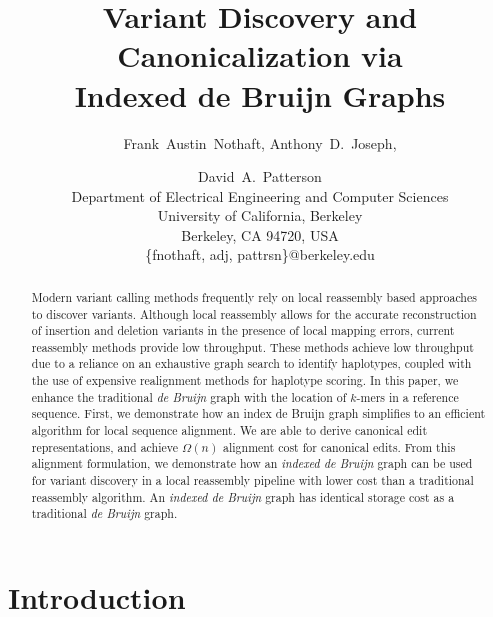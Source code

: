 \documentclass[11pt]{article}
\begin{document}
\title{Variant Discovery and Canonicalization via \\ Indexed de Bruijn Graphs}
\author{Frank~Austin~Nothaft, Anthony~D.~Joseph, \and David~A.~Patterson \\
Department of Electrical Engineering and Computer Sciences\\
University of California, Berkeley \\ 
Berkeley, CA 94720, USA \\
\{fnothaft, adj, pattrsn\}@berkeley.edu}

\maketitle              %

\begin{abstract}

Modern variant calling methods frequently rely on local reassembly based approaches to discover
variants. Although local reassembly allows for the accurate reconstruction of insertion and deletion
variants in the presence of local mapping errors, current reassembly methods provide low throughput.
These methods achieve low throughput due to a reliance on an exhaustive graph search to identify
haplotypes, coupled with the use of expensive realignment methods for haplotype scoring. In this paper,
we enhance the traditional \emph{de Bruijn} graph with the location of $k$-mers in a reference sequence.
First, we demonstrate how an index de Bruijn graph simplifies to an efficient algorithm for local sequence
alignment. We are able to derive canonical edit representations, and achieve $\Omega(n)$ alignment cost
for canonical edits. From this alignment formulation, we demonstrate how an \emph{indexed de Bruijn}
graph can be used for variant discovery in a local reassembly pipeline with lower cost than a traditional
reassembly algorithm. An \emph{indexed de Bruijn} graph has identical storage cost as a traditional
\emph{de Bruijn} graph. 

\end{abstract}

\section{Introduction}
\label{sec:introduction}
\end{document}
